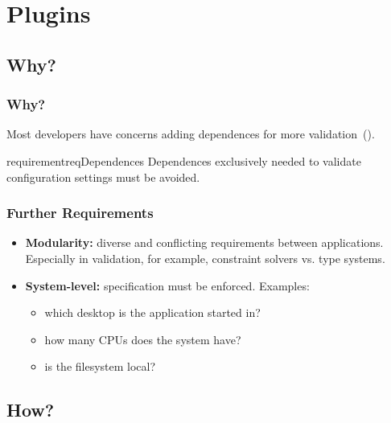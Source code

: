 \section{Plugins}

\subsection{Why?}


\begin{frame}
	\frametitle{Why?}
	\begin{finding}
	\methodQuestion{}
	Most developers have concerns adding dependences for more validation~().
	\end{finding}

	\begin{restatable}{requirement}{reqDependences}
	\label{req:dependences}
	Dependences exclusively needed to validate configuration settings must be avoided.
	\end{restatable}
\end{frame}

\begin{frame}
	\frametitle{Further Requirements}
	\begin{itemize}[<+->]
	\item \textbf{Modularity:} diverse and conflicting requirements between applications.
	Especially in validation, for example, \linebreak
	constraint solvers vs. type systems.
	\item \textbf{System-level:} specification must be enforced. Examples:
	\begin{itemize}[<+-| alert@+>]
	\item which desktop is the application started in?
	\item how many CPUs does the system have?
	\item is the filesystem local?
	\end{itemize}
	\end{itemize}
\end{frame}

\subsection{How?}

\begin{frame}
	\Large
\end{frame}

